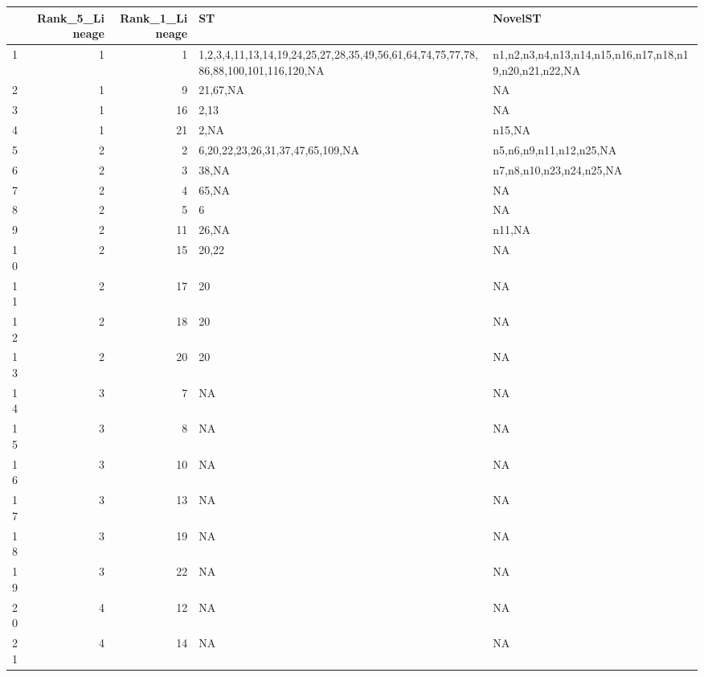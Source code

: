 \begin{table}[ht]
\centering
\begin{tabular}{lrrll}
  \hline
 & Rank\_5\_Lineage & Rank\_1\_Lineage & ST & NovelST \\ 
  \hline
1 & 1 & 1 & 1,2,3,4,11,13,14,19,24,25,27,28,35,49,56,61,64,74,75,77,78,86,88,100,101,116,120,NA & n1,n2,n3,n4,n13,n14,n15,n16,n17,n18,n19,n20,n21,n22,NA \\ 
  2 & 1 & 9 & 21,67,NA & NA \\ 
  3 & 1 & 16 & 2,13 & NA \\ 
  4 & 1 & 21 & 2,NA & n15,NA \\ 
  5 & 2 & 2 & 6,20,22,23,26,31,37,47,65,109,NA & n5,n6,n9,n11,n12,n25,NA \\ 
  6 & 2 & 3 & 38,NA & n7,n8,n10,n23,n24,n25,NA \\ 
  7 & 2 & 4 & 65,NA & NA \\ 
  8 & 2 & 5 & 6 & NA \\ 
  9 & 2 & 11 & 26,NA & n11,NA \\ 
  10 & 2 & 15 & 20,22 & NA \\ 
  11 & 2 & 17 & 20 & NA \\ 
  12 & 2 & 18 & 20 & NA \\ 
  13 & 2 & 20 & 20 & NA \\ 
  14 & 3 & 7 & NA & NA \\ 
  15 & 3 & 8 & NA & NA \\ 
  16 & 3 & 10 & NA & NA \\ 
  17 & 3 & 13 & NA & NA \\ 
  18 & 3 & 19 & NA & NA \\ 
  19 & 3 & 22 & NA & NA \\ 
  20 & 4 & 12 & NA & NA \\ 
  21 & 4 & 14 & NA & NA \\ 
   \hline
\end{tabular}
\end{table}
